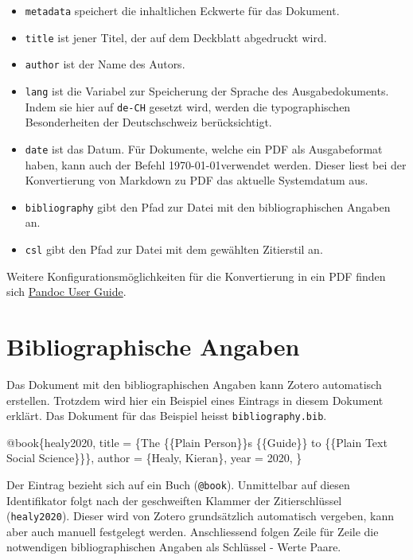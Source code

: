 \documentclass[
  nswissgerman,
  a4paper,
  DIV=11,
  numbers=noendperiod,
  ngerman]{scrreprt}
\newenvironment{Shaded}{\begin{snugshade}}{\end{snugshade}}
\newcommand{\DataTypeTok}[1]{\textcolor[rgb]{0.68,0.00,0.00}{#1}}
\newcommand{\NormalTok}[1]{\textcolor[rgb]{0.00,0.23,0.31}{#1}}
\newcommand{\OtherTok}[1]{\textcolor[rgb]{0.00,0.23,0.31}{#1}}
\newcommand{\VariableTok}[1]{\textcolor[rgb]{0.07,0.07,0.07}{#1}}
\begin{document}
\begin{itemize}
\item
  \texttt{metadata} speichert die inhaltlichen Eckwerte für das
  Dokument.
\item
  \texttt{title} ist jener Titel, der auf dem Deckblatt abgedruckt wird.
\item
  \texttt{author} ist der Name des Autors.
\item
  \texttt{lang} ist die Variabel zur Speicherung der Sprache des
  Ausgabedokuments. Indem sie hier auf \texttt{de-CH} gesetzt wird,
  werden die typographischen Besonderheiten der Deutschschweiz
  berücksichtigt.
\item
  \texttt{date} ist das Datum. Für Dokumente, welche ein PDF als
  Ausgabeformat haben, kann auch der Befehl \today verwendet werden.
  Dieser liest bei der Konvertierung von Markdown zu PDF das aktuelle
  Systemdatum aus.
\item
  \texttt{bibliography} gibt den Pfad zur Datei mit den
  bibliographischen Angaben an.
\item
  \texttt{csl} gibt den Pfad zur Datei mit dem gewählten Zitierstil an.
\end{itemize}

Weitere Konfigurationsmöglichkeiten für die Konvertierung in ein PDF
finden sich \href{https://pandoc.org/MANUAL.html}{Pandoc User Guide}.

\section{Bibliographische Angaben}\label{bibliographische-angaben}

Das Dokument mit den bibliographischen Angaben kann Zotero automatisch
erstellen. Trotzdem wird hier ein Beispiel eines Eintrags in diesem
Dokument erklärt. Das Dokument für das Beispiel heisst
\texttt{bibliography.bib}.

\begin{Shaded}
\begin{Highlighting}[numbers=left,,]
\VariableTok{@book}\NormalTok{\{}\OtherTok{healy2020}\NormalTok{,}
  \DataTypeTok{title}\NormalTok{ = \{The \{\{Plain Person\}\}\textquotesingle{}s \{\{Guide\}\} to \{\{Plain Text Social Science\}\}\},}
  \DataTypeTok{author}\NormalTok{ = \{Healy, Kieran\},}
  \DataTypeTok{year}\NormalTok{ = 2020,}
\NormalTok{  \}}
\end{Highlighting}
\end{Shaded}

Der Eintrag bezieht sich auf ein Buch (\texttt{@book}). Unmittelbar auf
diesen Identifikator folgt nach der geschweiften Klammer der
Zitierschlüssel (\texttt{healy2020}). Dieser wird von Zotero
grundsätzlich automatisch vergeben, kann aber auch manuell festgelegt
werden. Anschliessend folgen Zeile für Zeile die notwendigen
bibliographischen Angaben als Schlüssel - Werte Paare.
\end{document}
